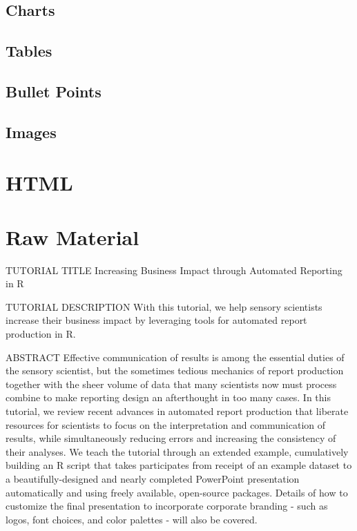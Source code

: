 \documentclass[
]{book}
\begin{document}
\hypertarget{charts}{%
\subsection{Charts}\label{charts}}

\hypertarget{tables}{%
\subsection{Tables}\label{tables}}

\hypertarget{bullet-points}{%
\subsection{Bullet Points}\label{bullet-points}}

\hypertarget{images}{%
\subsection{Images}\label{images}}

\hypertarget{html}{%
\section{HTML}\label{html}}

\hypertarget{raw-material-1}{%
\section{Raw Material}\label{raw-material-1}}

TUTORIAL TITLE
Increasing Business Impact through Automated Reporting in R

TUTORIAL DESCRIPTION
With this tutorial, we help sensory scientists increase their business impact by leveraging tools for automated report production in R.

ABSTRACT
Effective communication of results is among the essential duties of the sensory scientist, but the sometimes tedious mechanics of report production together with the sheer volume of data that many scientists now must process combine to make reporting design an afterthought in too many cases. In this tutorial, we review recent advances in automated report production that liberate resources for scientists to focus on the interpretation and communication of results, while simultaneously reducing errors and increasing the consistency of their analyses. We teach the tutorial through an extended example, cumulatively building an R script that takes participates from receipt of an example dataset to a beautifully-designed and nearly completed PowerPoint presentation automatically and using freely available, open-source packages. Details of how to customize the final presentation to incorporate corporate branding - such as logos, font choices, and color palettes - will also be covered.
\end{document}
